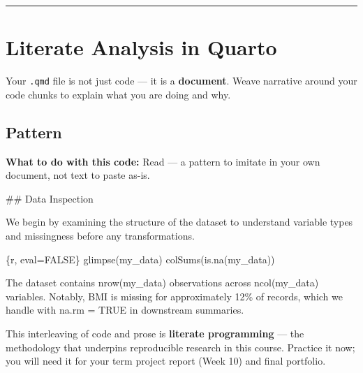 \documentclass[
  letterpaper,
  DIV=11,
  numbers=noendperiod,
  oneside]{scrreprt}
\newenvironment{Shaded}{\begin{snugshade}}{\end{snugshade}}
\newcommand{\FunctionTok}[1]{\textcolor[rgb]{0.28,0.35,0.67}{#1}}
\newcommand{\InformationTok}[1]{\textcolor[rgb]{0.37,0.37,0.37}{#1}}
\newcommand{\NormalTok}[1]{\textcolor[rgb]{0.00,0.23,0.31}{#1}}
\begin{document}
\begin{center}\rule{0.5\linewidth}{0.5pt}\end{center}

\section*{\texorpdfstring{Literate Analysis in Quarto
}{Literate Analysis in Quarto }}\label{literate-analysis-in-quarto}


Your \texttt{.qmd} file is not just code --- it is a \textbf{document}.
Weave narrative around your code chunks to explain what you are doing
and why.

\subsection*{Pattern}\label{pattern}

\textbf{What to do with this code:} Read --- a pattern to imitate in
your own document, not text to paste as-is.

\begin{Shaded}
\begin{Highlighting}[numbers=left,,]
\FunctionTok{\#\# Data Inspection}

\NormalTok{We begin by examining the structure of the dataset to understand}
\NormalTok{variable types and missingness before any transformations.}

\InformationTok{\textasciigrave{}\textasciigrave{}\textasciigrave{}\{r, eval=FALSE\}}
\FunctionTok{glimpse}\NormalTok{(my\_data)}
\FunctionTok{colSums}\NormalTok{(}\FunctionTok{is.na}\NormalTok{(my\_data))}
\InformationTok{\textasciigrave{}\textasciigrave{}\textasciigrave{}}


\NormalTok{The dataset contains }\InformationTok{\textasciigrave{}nrow(my\_data)\textasciigrave{}}\NormalTok{ observations across}
\InformationTok{\textasciigrave{}ncol(my\_data)\textasciigrave{}}\NormalTok{ variables. Notably, BMI is missing for}
\NormalTok{approximately 12\% of records, which we handle with }\InformationTok{\textasciigrave{}na.rm = TRUE\textasciigrave{}}
\NormalTok{in downstream summaries.}
\end{Highlighting}
\end{Shaded}

This interleaving of code and prose is \textbf{literate programming} ---
the methodology that underpins reproducible research in this course.
Practice it now; you will need it for your term project report (Week 10)
and final portfolio.
\end{document}
